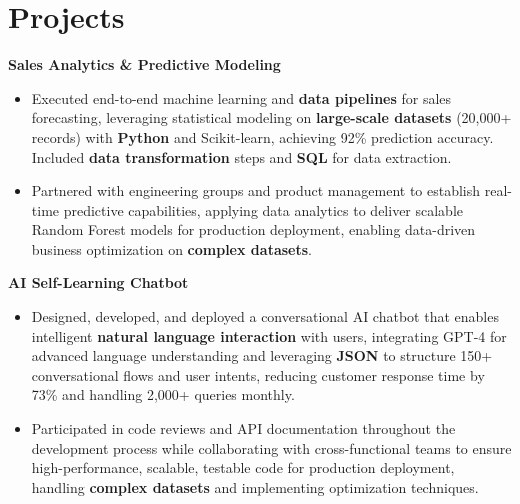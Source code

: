 \documentclass[a4paper,10pt]{article}
\begin{document}
\vspace{-4mm}

\section*{Projects}
\textbf{Sales Analytics \& Predictive Modeling} \\
\begin{itemize}[leftmargin=*, itemsep=0pt, parsep=1pt]
\vspace{-7mm}
    \item Executed end-to-end machine learning and \textbf{data pipelines} for sales forecasting, leveraging statistical modeling on \textbf{large-scale datasets} (20,000+ records) with \textbf{Python} and Scikit-learn, achieving 92\% prediction accuracy. Included \textbf{data transformation} steps and \textbf{SQL} for data extraction.
    \item Partnered with engineering groups and product management to establish real-time predictive capabilities, applying data analytics to deliver scalable Random Forest models for production deployment, enabling data-driven business optimization on \textbf{complex datasets}.
    \end{itemize}

\vspace{-2mm}
\textbf{AI Self-Learning Chatbot} \\
\begin{itemize}[leftmargin=*, itemsep=0pt, parsep=1pt]
\vspace{-7mm}
    \item Designed, developed, and deployed a conversational AI chatbot that enables intelligent \textbf{natural language interaction} with users, integrating GPT-4 for advanced language understanding and leveraging \textbf{JSON} to structure 150+ conversational flows and user intents, reducing customer response time by 73\% and handling 2,000+ queries monthly.
    \item Participated in code reviews and API documentation throughout the development process while collaborating with cross-functional teams to ensure high-performance, scalable, testable code for production deployment, handling \textbf{complex datasets} and implementing optimization techniques.
\end{itemize}

\vspace{-2mm}
\end{document}
